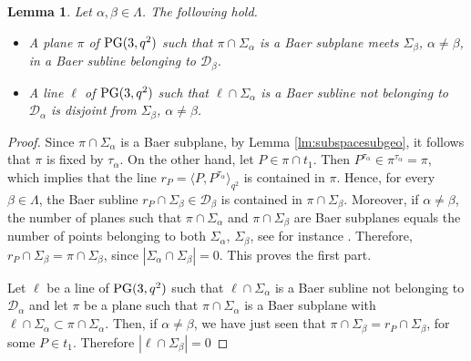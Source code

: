 \documentclass[11pt]{article}
\newtheorem{lemma}[theorem]{Lemma}
\theoremstyle{definition}
\numberwithin{equation}{section}
\def\cD{\mathcal D}
\def\PG{{\rm PG}}
\begin{document}
\begin{lemma}\label{lemma1}
Let $\alpha, \beta \in \Lambda$. The following hold.
\begin{itemize}
\item[i)] A plane $\pi$ of $\PG(3, q^2)$ such that $\pi \cap \Sigma_{\alpha}$ is a Baer subplane meets $\Sigma_{\beta}$, $\alpha \ne \beta$, in a Baer subline belonging to $\cD_{\beta}$.
\item[ii)] A line $\ell$ of $\PG(3, q^2)$ such that $\ell \cap \Sigma_{\alpha}$ is a Baer subline not belonging to $\cD_{\alpha}$ is disjoint from $\Sigma_{\beta}$, $\alpha \ne \beta$.
\end{itemize}
\end{lemma}
\begin{proof}
Since $\pi \cap \Sigma_{\alpha}$ is a Baer subplane, by Lemma \ref{lm:subspacesubgeo}, it follows that $\pi$ is fixed by $\tau_{\alpha}$. On the other hand, let $P \in \pi \cap t_1$. Then $P^{\tau_{\alpha}} \in \pi^{\tau_{\alpha}} = \pi$, which implies that the line $r_P = \langle P, P^{\tau_{\alpha}} \rangle_{q^2}$ is contained in $\pi$. Hence, for every $\beta \in \Lambda$, the Baer subline $r_P \cap \Sigma_{\beta} \in \cD_{\beta}$ is contained in $\pi \cap \Sigma_{\beta}$. Moreover, if $\alpha \ne \beta$, the number of planes such that $\pi \cap \Sigma_{\alpha}$ and $\pi \cap \Sigma_{\beta}$ are Baer subplanes equals the number of points belonging to both $\Sigma_{\alpha}$, $\Sigma_{\beta}$, see for instance \cite{bruen1982intersection}. Therefore, $r_P \cap \Sigma_{\beta} = \pi \cap \Sigma_{\beta}$, since $|\Sigma_{\alpha} \cap \Sigma_{\beta}| = 0$. This proves the first part. 


Let $\ell$ be a line of $\PG(3, q^2)$ such that $\ell \cap \Sigma_{\alpha}$ is a Baer subline not belonging to $\cD_{\alpha}$ and let $\pi$ be a plane such that $\pi \cap \Sigma_{\alpha}$ is a Baer subplane with $\ell \cap \Sigma_{\alpha} \subset \pi \cap \Sigma_{\alpha}$. Then, if $\alpha \ne \beta$, we have just seen that $\pi \cap \Sigma_{\beta} = r_{P} \cap \Sigma_{\beta}$, for some $P \in t_1$. Therefore $|\ell \cap \Sigma_{\beta}| = 0$ 
\end{proof} 
\end{document}
